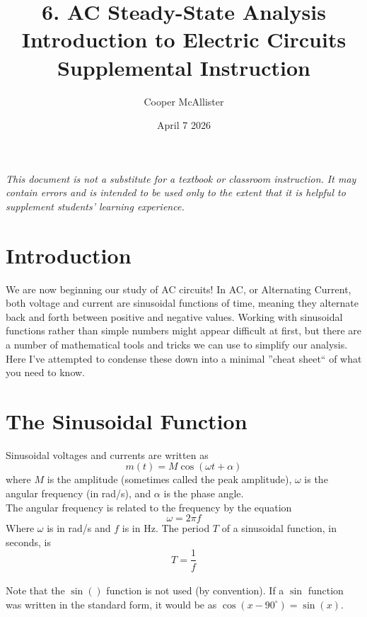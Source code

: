 \documentclass{article}
\title{6. AC Steady-State Analysis \\  \large Introduction to Electric Circuits \\ Supplemental Instruction}
\author{Cooper McAllister}
\date{April 7 2026}
\begin{document}
 {
	\fancyhf{}
	\renewcommand{\headrulewidth}{0pt}
	\renewcommand{\footrulewidth}{0.4pt}
	\fancyfoot[R]{\thepage}
}
\pagestyle{footerstyle}
\maketitle
\thispagestyle{footerstyle}

\begin{center}
\textit{This document is not a substitute for a textbook or classroom instruction. It may contain errors and is intended to be used only to the extent that it is helpful to supplement students' learning experience.}
\end{center}

\section{Introduction}
We are now beginning our study of AC circuits! In AC, or Alternating Current, both voltage and current are sinusoidal functions of time, meaning they alternate back and forth between positive and negative values. Working with sinusoidal functions rather than simple numbers might appear difficult at first, but there are a number of mathematical tools and tricks we can use to simplify our analysis. Here I've attempted to condense these down into a minimal ''cheat sheet`` of what you need to know.

\section{The Sinusoidal Function}
Sinusoidal voltages and currents are written as
$$m(t) = M\cos(\omega t + \alpha)$$
where $M$ is the amplitude (sometimes called the peak amplitude), $\omega$ is the angular frequency (in rad/s), and $\alpha$ is the phase angle.
\\The angular frequency is related to the frequency by the equation
$$\omega = 2\pi f$$
Where $\omega$ is in rad/s and $f$ is in Hz.
The period $T$ of a sinusoidal function, in seconds, is
$$T = \frac{1}{f}$$
\\Note that the $\sin()$ function is not used (by convention). If a $\sin$ function was written in the standard form, it would be as $\cos(x - 90^\circ) = \sin(x)$.
\end{document}
